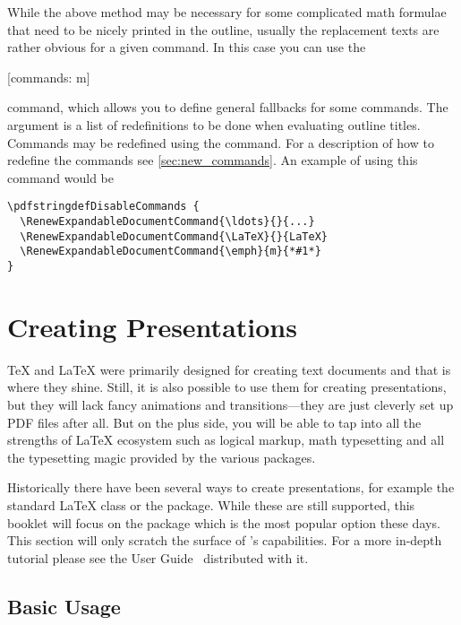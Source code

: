 While the above method may be necessary for some complicated math formulae
that need to be nicely printed in the outline, usually the replacement texts
are rather obvious for a given command. In this case you can use the
\begin{lscommand}
  [commands: m]
\end{lscommand}
command, which allows you to define general fallbacks for some commands. The
 argument is a list of redefinitions to be done when evaluating
outline titles. Commands may be redefined using the
 command. For a description of how to
redefine the commands see \autoref{sec:new_commands}. An example of using this
command would be
\begin{verbatim}
\pdfstringdefDisableCommands {
  \RenewExpandableDocumentCommand{\ldots}{}{...}
  \RenewExpandableDocumentCommand{\LaTeX}{}{LaTeX}
  \RenewExpandableDocumentCommand{\emph}{m}{*#1*}
}
\end{verbatim}

\section{Creating Presentations}\label{sec:beamer}
\begingroup
{}

\TeX{} and \LaTeX{} were primarily designed for creating text documents and
that is where they shine. Still, it is also possible to use them for creating
presentations, but they will lack fancy animations and transitions---they are
just cleverly set up PDF files after all. But on the plus side, you will be
able to tap into all the strengths of \LaTeX{} ecosystem such as logical
markup, math typesetting and all the typesetting magic provided by the various
packages.

Historically there have been several ways to create presentations, for example
the standard \LaTeX{}  class or the  package. While
these are still supported, this booklet will focus on the  package
which is the most popular option these days. This section will only scratch the
surface of 's capabilities. For a more in-depth tutorial please see
the User Guide~\cite{pack:beamer} distributed with it.

\subsection{Basic Usage}

